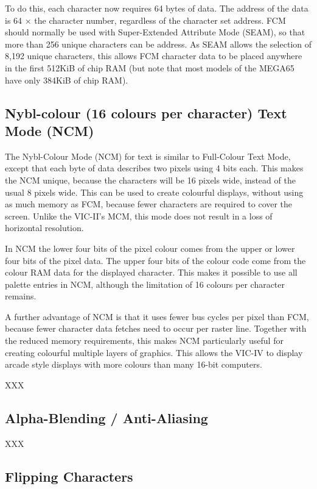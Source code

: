To do this, each character now requires 64 bytes of data. The address of the data is 64 $\times$ the character number, regardless
of the character set address.
FCM should
normally be used with Super-Extended Attribute Mode (SEAM), so that more than 256 unique characters can be address. As SEAM allows
the selection of 8,192 unique characters, this allows FCM character data to be placed anywhere in the first 512KiB of chip RAM (but
note that most models of the MEGA65 have only 384KiB of chip RAM).

\subsection{Nybl-colour (16 colours per character) Text Mode (NCM)}

The Nybl-Colour Mode (NCM) for text is similar to Full-Colour Text Mode, except that each byte of data describes two pixels using 4 bits each. This makes the NCM unique, because the characters will be 16 pixels wide, instead of the usual 8 pixels wide. This can be used to create colourful displays, without using as much memory as FCM, because fewer characters are required to cover the screen.  Unlike the VIC-II's MCM, this mode does not result in a loss of horizontal resolution.

In NCM the lower four bits of the pixel colour comes from the upper or lower four bits of the pixel data.  The upper four bits of the colour code come from the colour RAM data for the displayed character.  This makes it possible to use all palette entries in NCM, although the limitation of 16 colours per character remains.

A further advantage of NCM is that it uses fewer bus cycles per pixel than FCM, because fewer character data fetches need to occur per raster line.  Together with the reduced memory requirements, this makes NCM particularly useful for creating colourful multiple layers of graphics.  This allows the VIC-IV to display arcade style displays with more colours than many 16-bit computers.


XXX

\subsection{Alpha-Blending / Anti-Aliasing}

XXX

\subsection{Flipping Characters}

